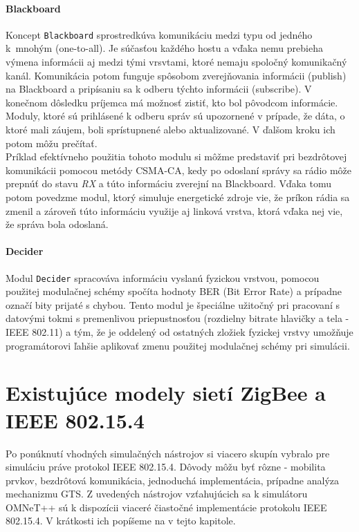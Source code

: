 \paragraph{Blackboard}
\indent Koncept \texttt{Blackboard} sprostredkúva komunikáciu medzi typu od jedného k~mnohým (one-to-all). Je súčasťou každého hostu a vďaka nemu prebieha výmena informácii aj medzi tými vrsvtami, ktoré nemaju spoločný komunikačný kanál. Komunikácia potom funguje spôsobom zverejňovania informácii (publish) na Blackboard a pripísaniu sa k odberu týchto informácii (subscribe). V konečnom dôsledku príjemca má možnosť zistiť, kto bol pôvodcom informácie. Moduly, ktoré sú prihlásené k odberu správ sú upozornené v prípade, že dáta, o ktoré mali záujem, boli sprístupnené alebo aktualizované. V ďalšom kroku ich potom môžu prečítať.\\
\indent Príklad efektívneho použitia tohoto modulu si môžme predstaviť pri bezdrôtovej komunikácii pomocou metódy CSMA-CA, kedy po odoslaní správy sa rádio môže prepnúť do stavu \textit{RX} a túto informáciu zverejní na Blackboard. Vďaka tomu potom povedzme modul, ktorý simuluje energetické zdroje vie, že príkon rádia sa zmenil a zároveň túto informáciu využije aj linková vrstva, ktorá vďaka nej vie, že správa bola odoslaná.\\
\paragraph{Decider}
\indent Modul \texttt{Decider} spracováva informáciu vyslanú fyzickou vrstvou, pomocou použitej modulačnej schémy spočíta hodnoty BER (Bit Error Rate) a prípadne označí bity prijaté s chybou. Tento modul je špeciálne užitočný pri pracovaní s datovými tokmi s premenlivou priepustnosťou (rozdielny bitrate hlavičky a tela - IEEE 802.11) a tým, že je oddelený od ostatných zložiek fyzickej vrstvy umožňuje programátorovi ľahšie aplikovať zmenu použitej modulačnej schémy pri simulácii.\\

\section{Existujúce modely sietí ZigBee a IEEE 802.15.4}
\indent\indent Po ponúknutí vhodných simulačných nástrojov si viacero skupín vybralo pre simuláciu práve protokol IEEE 802.15.4. Dôvody môžu byť rôzne - mobilita prvkov, bezdrôtová komunikácia, jednoduchá implementácia, prípadne analýza mechanizmu GTS. Z uvedených nástrojov vzťahujúcich sa k simulátoru OMNeT++ sú k dispozícii viaceré čiastočné implementácie protokolu IEEE 802.15.4. V krátkosti ich popíšeme na v tejto kapitole.\\
